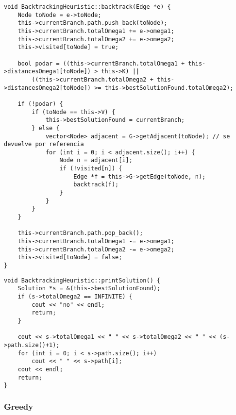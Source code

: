 \begin{lstlisting}[caption=BacktrackingHeuristic::backtrack()]
void BacktrackingHeuristic::backtrack(Edge *e) {
    Node toNode = e->toNode;
    this->currentBranch.path.push_back(toNode);
    this->currentBranch.totalOmega1 += e->omega1;
    this->currentBranch.totalOmega2 += e->omega2;
    this->visited[toNode] = true;
    
    bool podar = ((this->currentBranch.totalOmega1 + this->distancesOmega1[toNode]) > this->K) ||
        ((this->currentBranch.totalOmega2 + this->distancesOmega2[toNode]) >= this->bestSolutionFound.totalOmega2);

    if (!podar) {
        if (toNode == this->V) {
            this->bestSolutionFound = currentBranch;
        } else {
            vector<Node> adjacent = G->getAdjacent(toNode); // se devuelve por referencia
            for (int i = 0; i < adjacent.size(); i++) {
                Node n = adjacent[i];
                if (!visited[n]) {
                    Edge *f = this->G->getEdge(toNode, n);
                    backtrack(f);
                }
            }
        }
    }

    this->currentBranch.path.pop_back();
    this->currentBranch.totalOmega1 -= e->omega1;
    this->currentBranch.totalOmega2 -= e->omega2;
    this->visited[toNode] = false;
}
\end{lstlisting}
\begin{lstlisting}[caption=BacktrackingHeuristic::printSolution()]
void BacktrackingHeuristic::printSolution() {
    Solution *s = &(this->bestSolutionFound);
    if (s->totalOmega2 == INFINITE) {
        cout << "no" << endl;
        return;
    }

    cout << s->totalOmega1 << " " << s->totalOmega2 << " " << (s->path.size()+1);
    for (int i = 0; i < s->path.size(); i++)
        cout << " " << s->path[i];
    cout << endl;
    return;
}
\end{lstlisting}
\subsubsection{Greedy}

